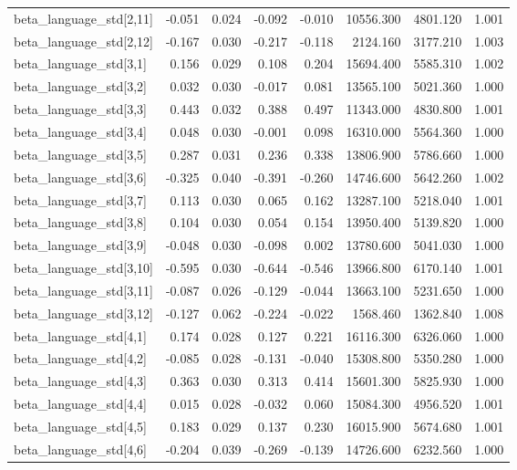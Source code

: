 \begin{tabular}{lrrrrrrr}
beta\_language\_std[2,11] & -0.051 & 0.024 & -0.092 & -0.010 & 10556.300 & 4801.120 & 1.001 \\
beta\_language\_std[2,12] & -0.167 & 0.030 & -0.217 & -0.118 & 2124.160 & 3177.210 & 1.003 \\
beta\_language\_std[3,1] & 0.156 & 0.029 & 0.108 & 0.204 & 15694.400 & 5585.310 & 1.002 \\
beta\_language\_std[3,2] & 0.032 & 0.030 & -0.017 & 0.081 & 13565.100 & 5021.360 & 1.000 \\
beta\_language\_std[3,3] & 0.443 & 0.032 & 0.388 & 0.497 & 11343.000 & 4830.800 & 1.001 \\
beta\_language\_std[3,4] & 0.048 & 0.030 & -0.001 & 0.098 & 16310.000 & 5564.360 & 1.000 \\
beta\_language\_std[3,5] & 0.287 & 0.031 & 0.236 & 0.338 & 13806.900 & 5786.660 & 1.000 \\
beta\_language\_std[3,6] & -0.325 & 0.040 & -0.391 & -0.260 & 14746.600 & 5642.260 & 1.002 \\
beta\_language\_std[3,7] & 0.113 & 0.030 & 0.065 & 0.162 & 13287.100 & 5218.040 & 1.001 \\
beta\_language\_std[3,8] & 0.104 & 0.030 & 0.054 & 0.154 & 13950.400 & 5139.820 & 1.000 \\
beta\_language\_std[3,9] & -0.048 & 0.030 & -0.098 & 0.002 & 13780.600 & 5041.030 & 1.000 \\
beta\_language\_std[3,10] & -0.595 & 0.030 & -0.644 & -0.546 & 13966.800 & 6170.140 & 1.001 \\
beta\_language\_std[3,11] & -0.087 & 0.026 & -0.129 & -0.044 & 13663.100 & 5231.650 & 1.000 \\
beta\_language\_std[3,12] & -0.127 & 0.062 & -0.224 & -0.022 & 1568.460 & 1362.840 & 1.008 \\
beta\_language\_std[4,1] & 0.174 & 0.028 & 0.127 & 0.221 & 16116.300 & 6326.060 & 1.000 \\
beta\_language\_std[4,2] & -0.085 & 0.028 & -0.131 & -0.040 & 15308.800 & 5350.280 & 1.000 \\
beta\_language\_std[4,3] & 0.363 & 0.030 & 0.313 & 0.414 & 15601.300 & 5825.930 & 1.000 \\
beta\_language\_std[4,4] & 0.015 & 0.028 & -0.032 & 0.060 & 15084.300 & 4956.520 & 1.001 \\
beta\_language\_std[4,5] & 0.183 & 0.029 & 0.137 & 0.230 & 16015.900 & 5674.680 & 1.001 \\
beta\_language\_std[4,6] & -0.204 & 0.039 & -0.269 & -0.139 & 14726.600 & 6232.560 & 1.000 \\

\end{tabular}
